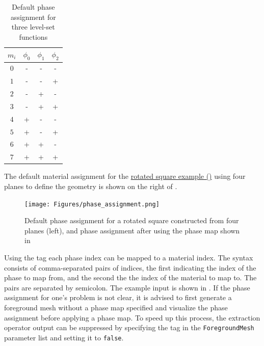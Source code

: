 \begin{table}[H]
\begin{center}
\begin{tabular}{ c|c c c } 
    $m_i$ & $\phi_0$ & $\phi_1$ & $\phi_2$ \\
    \hline
    $0$ & - & - & - \\ 
    $1$ & - & - & + \\ 
    $2$ & - & + & - \\ 
    $3$ & - & + & + \\ 
    $4$ & + & - & - \\ 
    $5$ & + & - & + \\ 
    $6$ & + & + & - \\ 
    $7$ & + & + & + \\ 
\end{tabular}
\caption{Default phase assignment for three level-set functions}
\label{tab:default_phase_assignment}
\end{center}
\end{table}

The default material assignment for the \href{https://github.com/kkmaute/moris/blob/main/share/doc/mesh_generation/examples/Rotated_Square_Example.xml}{rotated square example (\ExternalLink)} using four planes to define the geometry is shown on the right of . 

\begin{figure}[t]
    \begin{center}
    \texttt{[image: Figures/phase\_assignment.png]}
    \caption{Default phase assignment for a rotated square constructed from four planes (left), and phase assignment after using the phase map shown in } 
    \label{fig:phase_assignment}
    \end{center}
\end{figure}

Using the tag  each phase index can be mapped to a material index. The syntax consists of comma-separated pairs of indices, the first indicating the index of the phase to map from, and the second the the index of the material to map to. The pairs are separated by semicolon. The example input is shown in . If the phase assignment for one's problem is not clear, it is advised to first generate a foreground mesh without a phase map specified and visualize the phase assignment before applying a phase map. To speed up this process, the extraction operator output can be suppressed by specifying the tag  in the \texttt{ForegroundMesh} parameter list and setting it to \texttt{false}.

